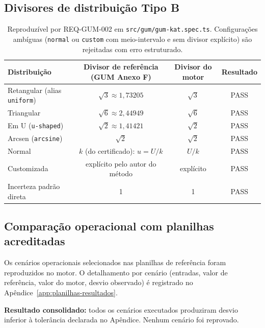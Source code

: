\documentclass[11pt,a4paper]{article}
\begin{document}
\subsection{Divisores de distribuição Tipo B}

\begin{table}[H]
  \centering
  \small
  \begin{tabularx}{\textwidth}{l c c c}
    \toprule
    \textbf{Distribuição} & \textbf{Divisor de referência (GUM Anexo F)} & \textbf{Divisor do motor} & \textbf{Resultado} \\
    \midrule
    Retangular (alias \texttt{uniform}) & \(\sqrt{3} \approx 1{,}73205\)   & \(\sqrt{3}\)   & PASS \\
    Triangular                          & \(\sqrt{6} \approx 2{,}44949\)   & \(\sqrt{6}\)   & PASS \\
    Em U (\texttt{u-shaped})            & \(\sqrt{2} \approx 1{,}41421\)   & \(\sqrt{2}\)   & PASS \\
    Arcsen (\texttt{arcsine})           & \(\sqrt{2}\)                     & \(\sqrt{2}\)   & PASS \\
    Normal                              & \(k\) (do certificado): \(u = U/k\) & \(U/k\)     & PASS \\
    Customizada                         & explícito pelo autor do método   & explícito      & PASS \\
    Incerteza padrão direta             & 1                                & 1              & PASS \\
    \bottomrule
  \end{tabularx}
  \caption*{\small Reproduzível por REQ-GUM-002 em \texttt{src/gum/gum-kat.spec.ts}. Configurações ambíguas (\texttt{normal} ou \texttt{custom} com meio-intervalo e sem divisor explícito) são rejeitadas com erro estruturado.}
\end{table}

\subsection{Comparação operacional com planilhas acreditadas}

Os cenários operacionais selecionados nas planilhas de referência foram reproduzidos no motor. O detalhamento por cenário (entradas, valor de referência, valor do motor, desvio observado) é registrado no Apêndice~\ref{app:planilhas-resultados}.

\textbf{Resultado consolidado:} todos os cenários executados produziram desvio inferior à tolerância declarada no Apêndice. Nenhum cenário foi reprovado.
\end{document}

